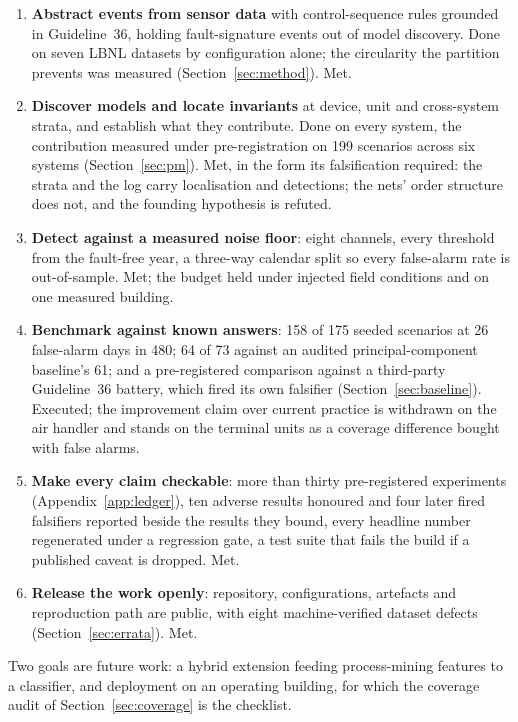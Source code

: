 \documentclass[11pt,letterpaper]{article}
\begin{document}
\begin{enumerate}[leftmargin=1.5em,itemsep=1pt,topsep=2pt]
\item \textbf{Abstract events from sensor data} with control-sequence rules grounded in Guideline~36, holding fault-signature events out of model discovery. Done on seven LBNL datasets by configuration alone; the circularity the partition prevents was measured (Section~\ref{sec:method}). Met.
\item \textbf{Discover models and locate invariants} at device, unit and cross-system strata, and establish what they contribute. Done on every system, the contribution measured under pre-registration on 199 scenarios across six systems (Section~\ref{sec:pm}). Met, in the form its falsification required: the strata and the log carry localisation and detections; the nets' order structure does not, and the founding hypothesis is refuted.
\item \textbf{Detect against a measured noise floor}: eight channels, every threshold from the fault-free year, a three-way calendar split so every false-alarm rate is out-of-sample. Met; the budget held under injected field conditions and on one measured building.
\item \textbf{Benchmark against known answers}: 158 of 175 seeded scenarios at 26 false-alarm days in 480; 64 of 73 against an audited principal-component baseline's 61; and a pre-registered comparison against a third-party Guideline~36 battery, which fired its own falsifier (Section~\ref{sec:baseline}). Executed; the improvement claim over current practice is withdrawn on the air handler and stands on the terminal units as a coverage difference bought with false alarms.
\item \textbf{Make every claim checkable}: more than thirty pre-registered experiments (Appendix~\ref{app:ledger}), ten adverse results honoured and four later fired falsifiers reported beside the results they bound, every headline number regenerated under a regression gate, a test suite that fails the build if a published caveat is dropped. Met.
\item \textbf{Release the work openly}: repository, configurations, artefacts and reproduction path are public, with eight machine-verified dataset defects (Section~\ref{sec:errata}). Met.
\end{enumerate}

\noindent Two goals are future work: a hybrid extension feeding process-mining features to a classifier, and deployment on an operating building, for which the coverage audit of Section~\ref{sec:coverage} is the checklist.
\end{document}
